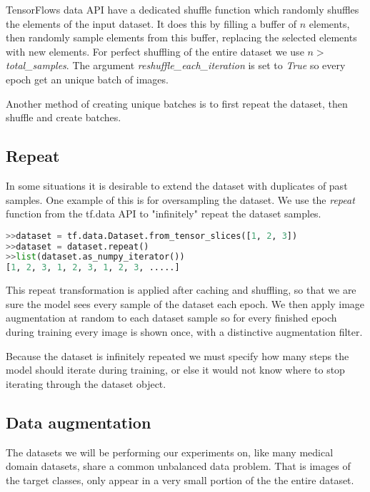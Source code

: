 \documentclass[thesis.tex]{subfiles}
\begin{document}
TensorFlows data API have a dedicated shuffle function which randomly shuffles the elements of the input dataset. It does this by filling a buffer of $n$ elements, then randomly sample elements from this buffer, replacing the selected elements with new elements. For perfect shuffling of the entire dataset we use $n>$ \textit{total\_samples}. The argument \textit{reshuffle\_each\_iteration} is set to \textit{True} so every epoch get an unique batch of images.

Another method of creating unique batches is to first repeat the dataset, then shuffle and create batches.



\subsection{Repeat}
In some situations it is desirable to extend the dataset with duplicates of past samples. One example of this is for oversampling the dataset. 
We use the \textit{repeat} function from the tf.data API to "infinitely" repeat the dataset samples.

\begin{lstlisting}[language=Python]
>>dataset = tf.data.Dataset.from_tensor_slices([1, 2, 3])
>>dataset = dataset.repeat()
>>list(dataset.as_numpy_iterator())
[1, 2, 3, 1, 2, 3, 1, 2, 3, .....]
\end{lstlisting}

This repeat transformation is applied after caching and shuffling, so that we are sure the model sees every sample of the dataset each epoch. We then apply image augmentation at random to each dataset sample so for every finished epoch during training every image is shown once, with a distinctive augmentation filter.

Because the dataset is infinitely repeated we must specify how many steps the model should iterate during training, or else it would not know where to stop iterating through the dataset object.



\subsection{Data augmentation}
The datasets we will be performing our experiments on, like many medical domain datasets, share a common unbalanced data problem. That is images of the target classes, only appear in a very small portion of the the entire dataset. 
\end{document}
